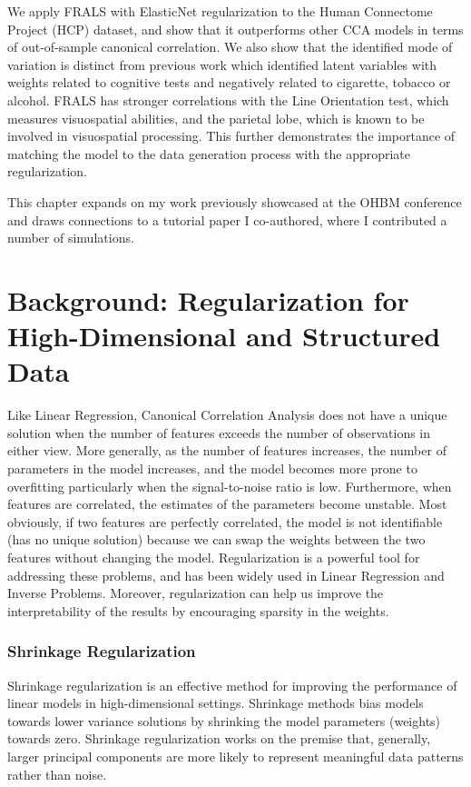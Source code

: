 We apply FRALS with ElasticNet regularization to the Human Connectome Project (HCP) dataset, and show that it outperforms other CCA models in terms of out-of-sample canonical correlation.
We also show that the identified mode of variation is distinct from previous work which identified latent variables with \gls{weights} related to cognitive tests and negatively related to cigarette, tobacco or alcohol\citep{smith2015positive}.
FRALS has stronger correlations with the Line Orientation test, which measures visuospatial abilities, and the parietal lobe, which is known to be involved in visuospatial processing.
This further demonstrates the importance of matching the model to the data generation process with the appropriate regularization.

This chapter expands on my work previously showcased at the OHBM conference and draws connections to a tutorial paper I co-authored, where I contributed a number of simulations\citep{mihalik2022canonical}.

\section{Background: Regularization for High-Dimensional and Structured Data}\label{sec:background}

Like Linear Regression, Canonical Correlation Analysis does not have a unique solution when the number of features exceeds the number of observations in either view.
More generally, as the number of features increases, the number of parameters in the model increases, and the model becomes more prone to overfitting particularly when the signal-to-noise ratio is low.
Furthermore, when features are correlated, the estimates of the parameters become unstable.
Most obviously, if two features are perfectly correlated, the model is not identifiable (has no unique solution) because we can swap the \gls{weights} between the two features without changing the model.
Regularization is a powerful tool for addressing these problems, and has been widely used in Linear Regression and Inverse Problems.
Moreover, regularization can help us improve the interpretability of the results by encouraging sparsity in the weights.

\subsubsection{Shrinkage Regularization}

Shrinkage regularization is an effective method for improving the performance of linear models in high-dimensional settings.
Shrinkage methods bias models towards lower variance solutions by shrinking the model parameters (weights) towards zero.
Shrinkage regularization works on the premise that, generally, larger principal components are more likely to represent meaningful data patterns rather than noise.

